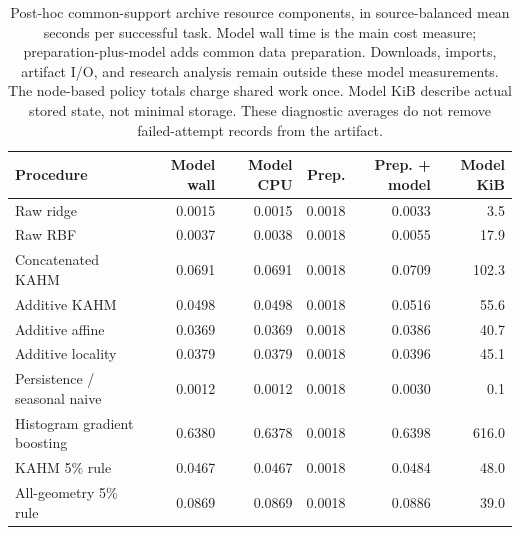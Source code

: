 \begin{table}[!htbp]
\centering\small\setlength{\tabcolsep}{4pt}
\caption{Post-hoc common-support archive resource components, in source-balanced mean seconds per successful task. Model wall time is the main cost measure; preparation-plus-model adds common data preparation. Downloads, imports, artifact I/O, and research analysis remain outside these model measurements. The node-based policy totals charge shared work once. Model KiB describe actual stored state, not minimal storage. These diagnostic averages do not remove failed-attempt records from the artifact.}
\label{tab:utility-cost-detail}
\begin{tabular}{lrrrrr}
\toprule
Procedure & Model wall & Model CPU & Prep. & Prep. + model & Model KiB \\
\midrule
Raw ridge & 0.0015 & 0.0015 & 0.0018 & 0.0033 & 3.5 \\
Raw RBF & 0.0037 & 0.0038 & 0.0018 & 0.0055 & 17.9 \\
Concatenated KAHM & 0.0691 & 0.0691 & 0.0018 & 0.0709 & 102.3 \\
Additive KAHM & 0.0498 & 0.0498 & 0.0018 & 0.0516 & 55.6 \\
Additive affine & 0.0369 & 0.0369 & 0.0018 & 0.0386 & 40.7 \\
Additive locality & 0.0379 & 0.0379 & 0.0018 & 0.0396 & 45.1 \\
Persistence / seasonal naive & 0.0012 & 0.0012 & 0.0018 & 0.0030 & 0.1 \\
Histogram gradient boosting & 0.6380 & 0.6378 & 0.0018 & 0.6398 & 616.0 \\
KAHM 5\% rule & 0.0467 & 0.0467 & 0.0018 & 0.0484 & 48.0 \\
All-geometry 5\% rule & 0.0869 & 0.0869 & 0.0018 & 0.0886 & 39.0 \\
\bottomrule
\end{tabular}
\end{table}
